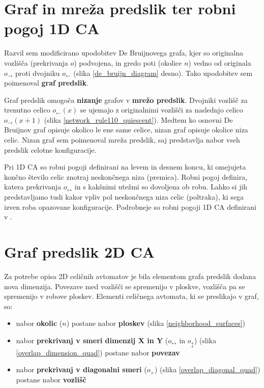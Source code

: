 \documentclass[12pt,a4paper,openany,twoside]{book}
\begin{document}
\section{Graf in mreža predslik ter robni pogoj 1D CA}

Razvil sem \cite{JerasDobnikar2007} modificirano upodobitev De Bruijnovega grafa,
kjer so originalna vozlišča (prekrivanja \(o\)) podvojena,
in gredo poti (okolice \(n\)) vedno od originala \(o_{\rightarrow}\)
proti dvojniku \(o_{\leftarrow}\) (slika \ref{de_bruijn_diagram} desno).
Tako upodobitev sem poimenoval \textbf{graf predslik}.

Graf predslik omogoča \textbf{nizanje} grafov v \textbf{mrežo predslik}.
Dvojniki vozlišč za trenutno celico \(o_{\leftarrow}(x)\) se ujemajo z
originalnimi vozlišči za naslednjo celico \(o_{\rightarrow}(x+1)\) (slika \ref{network_rule110_quiescent}).
Medtem ko osnovni De Bruijnov graf opisuje okolico le ene same celice,
nizan graf opisuje okolice niza celic.
Nizan graf sem poimenoval mreža predslik,
saj predstavlja nabor vseh predslik celotne konfiguracije.

Pri 1D CA so robni pogoji definirani na levem in desnem koncu,
ki omejujeta končno število celic znotraj neskončnega niza (premica).
Robni pogoj definira, katera prekrivanja \(o_{\leftrightarrow}\)
in s kakšnimi utežmi so dovoljena ob robu.
Lahko si jih predstavljamo tudi kakor vpliv pol neskončnega niza celic (poltraka),
ki sega izven roba opazovane konfiguracije.
Podrobneje so robni pogoji 1D CA definirani v \cite{JerasDobnikar2007}.

\section{Graf predslik 2D CA}

Za potrebe opisa 2D celičnih avtomatov je bila elementom
grafa predslik dodana nova dimenzija. Povezave med vozlišči se spremenijo
v ploskve, vozlišča pa se spremenijo v robove ploskev.
Elementi celičnega avtomata, ki se preslikajo v graf, so:
\begin{itemize}[noitemsep,nolistsep]
\item nabor \textbf{okolic} (\(n\)) postane nabor \textbf{ploskev} (slika \ref{neighborhood_surfaces})
\item nabor \textbf{prekrivanj v smeri dimenzij X in Y} (\(o_{\leftrightarrow}\) in \(o_{\updownarrow}\)) (slika \ref{overlap_dimension_quad}) postane nabor \textbf{povezav}
\item nabor \textbf{prekrivanj v diagonalni smeri} (\(o_{\times}\)) (slika \ref{overlap_diagonal_quad}) postane nabor \textbf{vozlišč}
\end{itemize}
\end{document}
